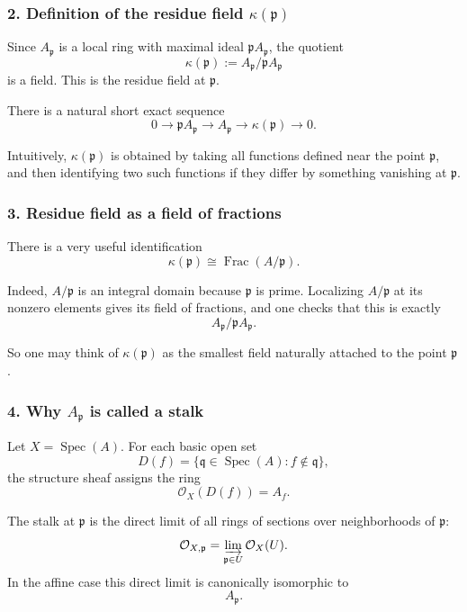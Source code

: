 \documentclass[12pt,a4paper]{article}
\theoremstyle{notespace}
\newcommand{\Spec}{\operatorname{Spec}}
\theoremstyle{definition}
\begin{document}
\subsubsection{2. Definition of the residue field \(\kappa(\mathfrak p)\)}

Since \(A_{\mathfrak p}\) is a local ring with maximal ideal \(\mathfrak p A_{\mathfrak p}\), the quotient
\[
\kappa(\mathfrak p):=A_{\mathfrak p}/\mathfrak p A_{\mathfrak p}
\]
is a field. This is the residue field at \(\mathfrak p\).

There is a natural short exact sequence
\[
0
\longrightarrow
\mathfrak p A_{\mathfrak p}
\longrightarrow
A_{\mathfrak p}
\longrightarrow
\kappa(\mathfrak p)
\longrightarrow
0.
\]

Intuitively, \(\kappa(\mathfrak p)\) is obtained by taking all functions defined near the point \(\mathfrak p\), and then identifying two such functions if they differ by something vanishing at \(\mathfrak p\).

\subsubsection{3. Residue field as a field of fractions}

There is a very useful identification
\[
\kappa(\mathfrak p)\cong \operatorname{Frac}(A/\mathfrak p).
\]

Indeed, \(A/\mathfrak p\) is an integral domain because \(\mathfrak p\) is prime. Localizing \(A/\mathfrak p\) at its nonzero elements gives its field of fractions, and one checks that this is exactly
\[
A_{\mathfrak p}/\mathfrak p A_{\mathfrak p}.
\]

So one may think of \(\kappa(\mathfrak p)\) as the smallest field naturally attached to the point \(\mathfrak p\).

\subsubsection{4. Why \(A_{\mathfrak p}\) is called a stalk}

Let \(X=\Spec(A)\). For each basic open set
\[
D(f)=\{\mathfrak q\in \Spec(A):f\notin \mathfrak q\},
\]
the structure sheaf assigns the ring
\[
\mathcal O_X(D(f))=A_f.
\]

The stalk at \(\mathfrak p\) is the direct limit of all rings of sections over neighborhoods of \(\mathfrak p\):
\[
\mathcal O_{X,\mathfrak p}
=
\varinjlim_{\mathfrak p\in U}\mathcal O_X(U).
\]
In the affine case this direct limit is canonically isomorphic to
\[
A_{\mathfrak p}.
\]
\end{document}
